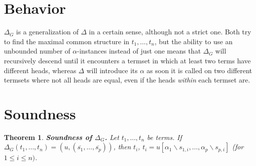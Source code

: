 \documentclass[a4paper, 11pt]{report}
\newtheorem{theorem}{Theorem}
\begin{document}
\section{Behavior}

$\Delta_G$ is a generalization of $\Delta$ in a certain sense, although not a strict one. Both try to find the maximal common structure in $t_1,\dots,t_n$, but the ability to use an unbounded number of $\alpha$-instances instead of just one means that $\Delta_G$ will recursively descend until it encounters a termset in which at least two terms have different heads, whereas $\Delta$ will introduce its $\alpha$ as soon it is called on two different termsets where not all heads are equal, even if the heads {\em within} each termset are.

\section{Soundness}

\begin{theorem}
\textbf{Soundness of $\Delta_G$.}
Let $t_1,\dots,t_n$ be terms. If $\Delta_G(t_1,\dots,t_n) = (u,(\overline{s_1},\dots,\overline{s_p}))$, then $t_i$, $t_i = u[\alpha_1\backslash s_{1,i},\dots,\alpha_p\backslash s_{p,i}]$ (for $1\leq i \leq n)$.
\label{thm:DeltaGSoundness}
\end{theorem}
\end{document}
